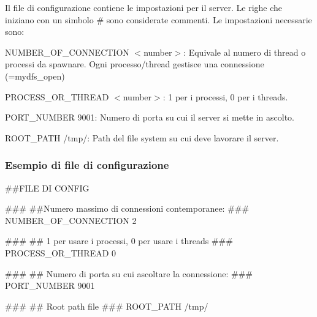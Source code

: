 Il file di configurazione contiene le impostazioni per il server. Le righe che iniziano con un simbolo {\ttfamily \#} sono considerate commenti. Le impostazioni necessarie sono\+:


\begin{DoxyItemize}
\item {\ttfamily N\+U\+M\+B\+E\+R\+\_\+\+O\+F\+\_\+\+C\+O\+N\+N\+E\+C\+T\+I\+O\+N $<$number$>$}\+: Equivale al numero di thread o processi da spawnare. Ogni processo/thread gestisce una connessione (=mydfs\+\_\+open)
\item {\ttfamily P\+R\+O\+C\+E\+S\+S\+\_\+\+O\+R\+\_\+\+T\+H\+R\+E\+A\+D $<$number$>$}\+: 1 per i processi, 0 per i threads.
\item {\ttfamily P\+O\+R\+T\+\_\+\+N\+U\+M\+B\+E\+R 9001}\+: Numero di porta su cui il server si mette in ascolto.
\item {\ttfamily R\+O\+O\+T\+\_\+\+P\+A\+T\+H /tmp/}\+: Path del file system su cui deve lavorare il server.
\end{DoxyItemize}

\subsubsection*{Esempio di file di configurazione}

\begin{DoxyVerb}##FILE DI CONFIG

###
##Numero massimo di connessioni contemporanee:
###
NUMBER_OF_CONNECTION 2

###
## 1 per usare i processi, 0 per usare i threads
###
PROCESS_OR_THREAD 0

###
## Numero di porta su cui ascoltare la connessione:
###
PORT_NUMBER 9001

###
## Root path file
###
ROOT_PATH /tmp/\end{DoxyVerb}
 